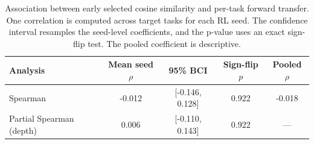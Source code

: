 \begin{table}[t]
    \centering
    \small
    \begin{tabular}{lcccc}
        \toprule
        Analysis & Mean seed $\rho$ & 95\% BCI & Sign-flip $p$ & Pooled $\rho$ \\
        \midrule
        Spearman & -0.012 & [-0.146, 0.128] & 0.922 & -0.018 \\
        Partial Spearman (depth) & 0.006 & [-0.110, 0.143] & 0.922 & --- \\
        \bottomrule
    \end{tabular}
    \caption{Association between early selected cosine similarity and per-task forward transfer. One correlation is computed across target tasks for each RL seed. The confidence interval resamples the seed-level coefficients, and the p-value uses an exact sign-flip test. The pooled coefficient is descriptive.}
    \label{tbl:similarity_fwt_correlation}
\end{table}
